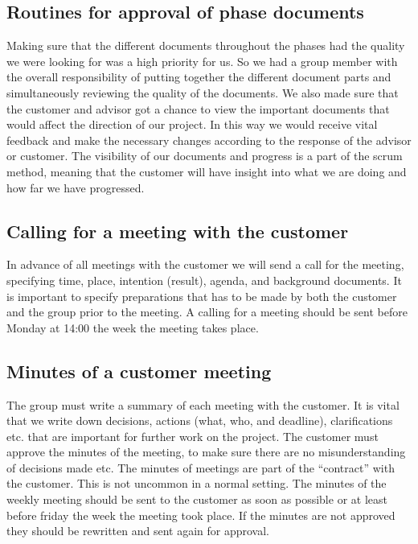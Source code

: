 \subsection{Routines for approval of phase documents}
Making sure that the different documents throughout the phases had the quality we were looking for was a high priority for us. So we had a group member with the overall responsibility of putting together the different document parts and simultaneously reviewing the quality of the documents.
\newline
\newline 
We also made sure that the customer and advisor got a chance to view the important documents that would affect the direction of our project. In this way we would receive vital feedback and make the necessary changes according to the response of the advisor or customer. 
\newline
\newline
The visibility of our documents and progress is a part of the scrum method, meaning that the customer will have insight into what we are doing and how far we have progressed.   

\subsection{Calling for a meeting with the customer}
In advance of all meetings with the customer we will send a call for the meeting, specifying time, place, intention (result), agenda, and background documents. It is important to specify preparations that has to be made by both the customer and the group prior to the meeting.
\newline
\newline
A calling for a meeting should be sent before Monday at 14:00 the week the meeting takes place.

\subsection{Minutes of a customer meeting}
The group must write a summary of each meeting with the customer. It is vital that we write down decisions, actions (what, who, and deadline), clarifications etc. that are important for further work on the project. The customer must approve the minutes of the meeting, to make sure there are no misunderstanding of decisions made etc. The minutes of meetings are part of the “contract” with the customer. This is not uncommon in a normal setting.
\newline
\newline
The minutes of the weekly meeting should be sent to the customer as soon as possible or at least before friday the week the meeting took place. If the minutes are not approved they should be rewritten and sent again for approval. 

